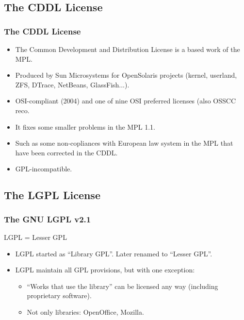 \documentclass{beamer}
\begin{document}
\subsection{The CDDL License}
\begin{frame}
\frametitle{The CDDL License}

\begin{itemize}
\item The Common Development and Distribution License is a based work of the MPL. 
\item Produced by Sun Microsystems for OpenSolaris projects (kernel, userland, ZFS, DTrace, NetBeans, GlassFish...).
\item OSI-compliant (2004) and one of nine OSI preferred licenses (also OSSCC reco.
\item It fixes some smaller problems in the MPL 1.1. 
\item Such as some non-copliances with European law system in the MPL that have been corrected in the CDDL.
\item GPL-incompatible.
\end{itemize}

\end{frame}


\subsection{The LGPL License}
\begin{frame}
\frametitle{The GNU LGPL v2.1}

\begin{center}
LGPL = Lesser GPL
\end{center}

\begin{itemize}
\item LGPL started as ``Library GPL''. Later renamed to ``Lesser
  GPL''.
\item LGPL maintain all GPL provisions, but with one exception:
\begin{itemize}
  \item ``Works that use the library'' \alert{can be licensed any way} (including proprietary software).
  \item Not only libraries: OpenOffice, Mozilla.
\end{itemize}
\end{itemize}

\end{frame}
\end{document}
